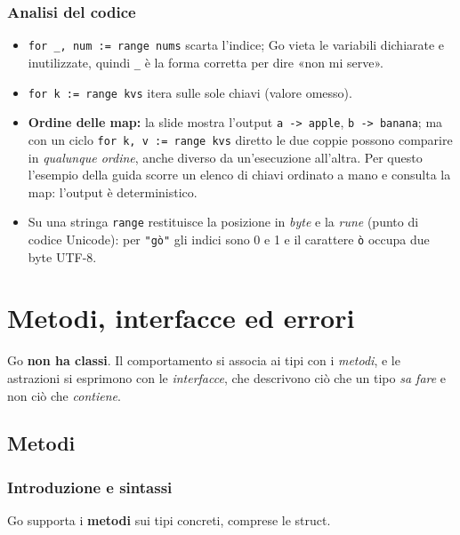 \documentclass[11pt,a4paper]{report}
\newcommand{\cod}[1]{\texttt{#1}}
\begin{document}
\subsection{Analisi del codice}

\begin{itemize}
  \item \cod{for \_, num := range nums} scarta l'indice; Go vieta le variabili
        dichiarate e inutilizzate, quindi \cod{\_} è la forma corretta per
        dire «non mi serve».
  \item \cod{for k := range kvs} itera sulle sole chiavi (valore omesso).
  \item \textbf{Ordine delle map:} la slide mostra l'output
        \cod{a -> apple}, \cod{b -> banana}; ma con un ciclo
        \cod{for k, v := range kvs} diretto le due coppie possono comparire in
        \emph{qualunque ordine}, anche diverso da un'esecuzione all'altra. Per questo
        l'esempio della guida scorre un elenco di chiavi ordinato a mano
        e consulta la map: l'output è deterministico.
  \item Su una stringa \cod{range} restituisce la posizione in \emph{byte} e la
        \emph{rune} (punto di codice Unicode): per \cod{"gò"} gli indici sono 0 e
        1 e il carattere \cod{ò} occupa due byte UTF-8.
\end{itemize}

\chapter{Metodi, interfacce ed errori}\label{ch:oop}

Go \textbf{non ha classi}. Il comportamento si associa ai tipi con i
\emph{metodi}, e le astrazioni si esprimono con le \emph{interfacce}, che
descrivono ciò che un tipo \emph{sa fare} e non ciò che \emph{contiene}.

\section{Metodi}

\subsection{Introduzione e sintassi}

Go supporta i \textbf{metodi} sui tipi concreti, comprese le struct.
\end{document}
